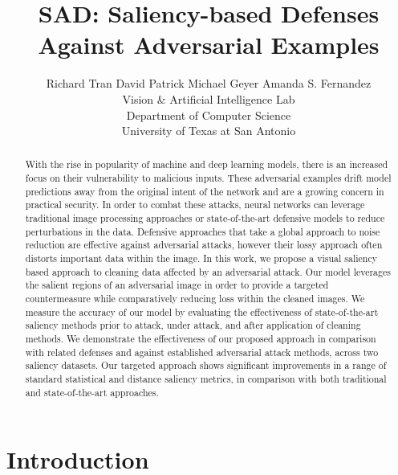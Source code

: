 \documentclass[10pt,twocolumn,letterpaper]{article}
\begin{document}
\title{SAD: Saliency-based Defenses Against Adversarial Examples}


\author{Richard Tran \hspace{1em}  David Patrick \hspace{1cm} Michael Geyer \hspace{1cm} Amanda S. Fernandez\\
Vision \& Artificial Intelligence Lab \\
Department of Computer Science \\
University of Texas at San Antonio 
}


\maketitle
\ifwacvfinal\thispagestyle{empty}\fi

\begin{abstract}
With the rise in popularity of machine and deep learning models, there is an increased focus on their vulnerability to malicious inputs.
These adversarial examples drift model predictions away from the original intent of the network and are a growing concern in practical security.
In order to combat these attacks, neural networks can leverage traditional image processing approaches or state-of-the-art defensive models to reduce perturbations in the data.
Defensive approaches that take a global approach to noise reduction are effective against adversarial attacks, however their lossy approach often distorts important data within the image.
In this work, we propose a visual saliency based approach to cleaning data affected by an adversarial attack.
Our model leverages the salient regions of an adversarial image in order to provide a targeted countermeasure while comparatively reducing loss within the cleaned images.
We measure the accuracy of our model by evaluating the effectiveness of state-of-the-art saliency methods prior to attack, under attack, and after application of cleaning methods.
We demonstrate the effectiveness of our proposed approach in comparison with related defenses and against established adversarial attack methods, across two saliency datasets.
Our targeted approach shows significant improvements in a range of standard statistical and distance saliency metrics, in comparison with both traditional and state-of-the-art approaches.
\end{abstract}

\section{Introduction} 
\end{document}
